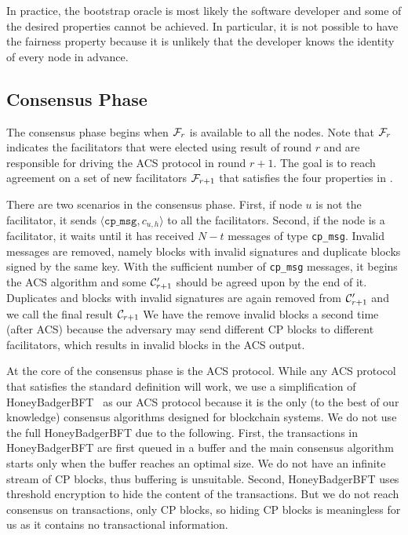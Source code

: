 In practice, the bootstrap oracle is most likely the software developer and some of the desired properties cannot be achieved.
In particular, it is not possible to have the fairness property because it is unlikely that the developer knows the identity of every node in advance.

\subsection{Consensus Phase}
\label{sec:consensus-phase}
The consensus phase begins when $\mathcal{F}_r$ is available to all the nodes.
Note that $\mathcal{F}_r$ indicates the facilitators that were elected using result of round $r$ and are responsible for driving the ACS protocol in round $r + 1$.
The goal is to reach agreement on a set of new facilitators $\mathcal{F}_{r + 1}$ that satisfies the four properties in .

There are two scenarios in the consensus phase.
First, if node $u$ is not the facilitator, it sends $\langle \texttt{cp\_msg}, c_{u, h} \rangle$ to all the facilitators.
Second, if the node is a facilitator, it waits until it has received $N - t$ messages of type \texttt{cp\_msg}.
Invalid messages are removed, namely blocks with invalid signatures and duplicate blocks signed by the same key.
With the sufficient number of \texttt{cp\_msg} messages,
it begins the ACS algorithm and some $\mathcal{C}'_{r + 1}$ should be agreed upon by the end of it.
Duplicates and blocks with invalid signatures are again removed from $\mathcal{C}'_{r+1}$ and we call the final result $\mathcal{C}_{r+1}$
We have the remove invalid blocks a second time (after ACS) because the adversary may send different CP blocks to different facilitators,
which results in invalid blocks in the ACS output.

At the core of the consensus phase is the ACS protocol.
While any ACS protocol that satisfies the standard definition will work,
we use a simplification of HoneyBadgerBFT~\cite{miller2016honey} as our ACS protocol
because it is the only (to the best of our knowledge) consensus algorithms designed for blockchain systems.
We do not use the full HoneyBadgerBFT due to the following.
First, the transactions in HoneyBadgerBFT are first queued in a buffer and the main consensus algorithm starts only when the buffer reaches an optimal size.
We do not have an infinite stream of CP blocks, thus buffering is unsuitable.
Second, HoneyBadgerBFT uses threshold encryption to hide the content of the transactions.
But we do not reach consensus on transactions, only CP blocks, so hiding CP blocks is meaningless for us as it contains no transactional information.

